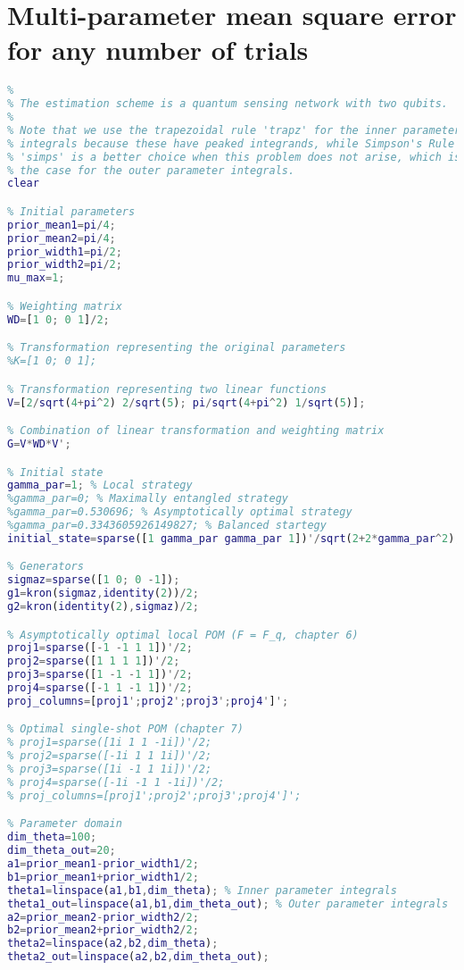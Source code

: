 \section{Multi-parameter mean square error for any number of trials}
\label{sec:multimsematlab}

\begin{lstlisting}[language=Matlab, mathescape=true]
% Mean square error for the estimation of two linear functions
%
% The estimation scheme is a quantum sensing network with two qubits.
%
% Note that we use the trapezoidal rule 'trapz' for the inner parameter 
% integrals because these have peaked integrands, while Simpson's Rule 
% 'simps' is a better choice when this problem does not arise, which is
% the case for the outer parameter integrals.
clear

% Initial parameters
prior_mean1=pi/4;
prior_mean2=pi/4;
prior_width1=pi/2;
prior_width2=pi/2;
mu_max=1;

% Weighting matrix
WD=[1 0; 0 1]/2;

% Transformation representing the original parameters
%K=[1 0; 0 1];

% Transformation representing two linear functions
V=[2/sqrt(4+pi^2) 2/sqrt(5); pi/sqrt(4+pi^2) 1/sqrt(5)];

% Combination of linear transformation and weighting matrix
G=V*WD*V';

% Initial state
gamma_par=1; % Local strategy
%gamma_par=0; % Maximally entangled strategy
%gamma_par=0.530696; % Asymptotically optimal strategy
%gamma_par=0.3343605926149827; % Balanced startegy
initial_state=sparse([1 gamma_par gamma_par 1])'/sqrt(2+2*gamma_par^2);

% Generators
sigmaz=sparse([1 0; 0 -1]);
g1=kron(sigmaz,identity(2))/2;
g2=kron(identity(2),sigmaz)/2;

% Asymptotically optimal local POM (F = F_q, chapter 6)
proj1=sparse([-1 -1 1 1])'/2;
proj2=sparse([1 1 1 1])'/2;
proj3=sparse([1 -1 -1 1])'/2;
proj4=sparse([-1 1 -1 1])'/2;
proj_columns=[proj1';proj2';proj3';proj4']';

% Optimal single-shot POM (chapter 7)
% proj1=sparse([1i 1 1 -1i])'/2;
% proj2=sparse([-1i 1 1 1i])'/2;
% proj3=sparse([1i -1 1 1i])'/2;
% proj4=sparse([-1i -1 1 -1i])'/2;
% proj_columns=[proj1';proj2';proj3';proj4']';

% Parameter domain
dim_theta=100;
dim_theta_out=20;
a1=prior_mean1-prior_width1/2;
b1=prior_mean1+prior_width1/2;
theta1=linspace(a1,b1,dim_theta); % Inner parameter integrals
theta1_out=linspace(a1,b1,dim_theta_out); % Outer parameter integrals
a2=prior_mean2-prior_width2/2;
b2=prior_mean2+prior_width2/2;
theta2=linspace(a2,b2,dim_theta);
theta2_out=linspace(a2,b2,dim_theta_out);


\end{lstlisting}
